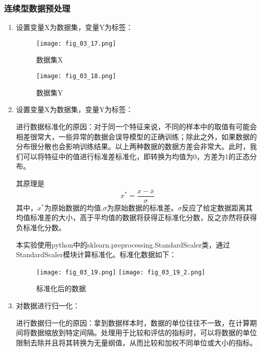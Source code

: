 \subsubsection{连续型数据预处理}
	\begin{enumerate}  
		\item 设置变量X为数据集，变量Y为标签：
			
			\begin{figure}[h]  %
				\centering
				\texttt{[image: fig\_03\_17.png]}
				\caption{数据集X}
				\label{}
			\end{figure}
			\begin{figure}[h]  %
				\centering
				\texttt{[image: fig\_03\_18.png]}
				\caption{数据集Y}
				\label{}
			\end{figure}
		\item 设置变量X为数据集，变量Y为标签：
			
			进行数据标准化的原因：对于同一个特征来说，不同的样本中的取值有可能会相差很常大，一些异常的数据会误导模型的正确训练；除此之外，如果数据的分布很分散也会影响训练结果。以上两种数据的数据方差会非常大。此时，我们可以将特征中的值进行标准差标准化，即转换为均值为0，方差为1的正态分布。
	
			其原理是 
			$$x^{*}=\frac{x-\overline{x}}{\sigma}$$  %
			其中，$x^*$为原始数据的均值,$\sigma$为原始数据的标准差。$\sigma$反应了给定数据距离其均值标准差的大小，高于平均值的数据将获得正标准化分数，反之亦然将获得负标准化分数。
			
			本实验使用python中的sklearn.preprocessing.StandardScaler类，通过
			StandardScaler模块计算标准化。标准化数据如下：
			\begin{figure}[h]  %
				\centering
				\texttt{[image: fig\_03\_19.png]}
				\texttt{[image: fig\_03\_19\_2.png]}
				\caption{标准化后的数据}
				\label{}
			\end{figure}

		\item 对数据进行归一化：
		
			进行数据归一化的原因：拿到数据样本时，数据的单位往往不一致，在计算期间将数据缩放到特定间隔。处理用于比较和评估的指标时，可以将数据的单位限制去除并且将其转换为无量纲值，从而比较和加权不同单位或大小的指标。


	\end{enumerate} 

